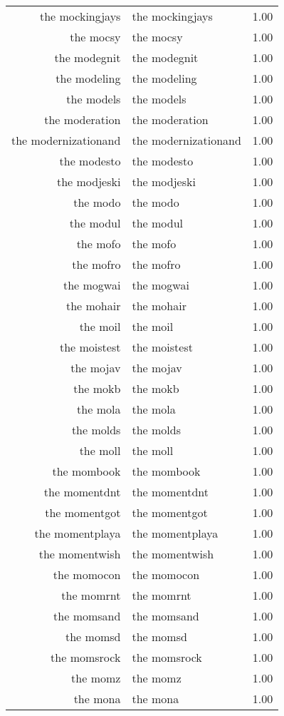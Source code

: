 \begin{table}[ht]
\begin{tabular}{rlr}
  the mockingjays & the mockingjays & 1.00 \\ 
  the mocsy & the mocsy & 1.00 \\ 
  the modegnit & the modegnit & 1.00 \\ 
  the modeling & the modeling & 1.00 \\ 
  the models & the models & 1.00 \\ 
  the moderation & the moderation & 1.00 \\ 
  the modernizationand & the modernizationand & 1.00 \\ 
  the modesto & the modesto & 1.00 \\ 
  the modjeski & the modjeski & 1.00 \\ 
  the modo & the modo & 1.00 \\ 
  the modul & the modul & 1.00 \\ 
  the mofo & the mofo & 1.00 \\ 
  the mofro & the mofro & 1.00 \\ 
  the mogwai & the mogwai & 1.00 \\ 
  the mohair & the mohair & 1.00 \\ 
  the moil & the moil & 1.00 \\ 
  the moistest & the moistest & 1.00 \\ 
  the mojav & the mojav & 1.00 \\ 
  the mokb & the mokb & 1.00 \\ 
  the mola & the mola & 1.00 \\ 
  the molds & the molds & 1.00 \\ 
  the moll & the moll & 1.00 \\ 
  the mombook & the mombook & 1.00 \\ 
  the momentdnt & the momentdnt & 1.00 \\ 
  the momentgot & the momentgot & 1.00 \\ 
  the momentplaya & the momentplaya & 1.00 \\ 
  the momentwish & the momentwish & 1.00 \\ 
  the momocon & the momocon & 1.00 \\ 
  the momrnt & the momrnt & 1.00 \\ 
  the momsand & the momsand & 1.00 \\ 
  the momsd & the momsd & 1.00 \\ 
  the momsrock & the momsrock & 1.00 \\ 
  the momz & the momz & 1.00 \\ 
  the mona & the mona & 1.00 \\ 

\end{tabular}
\end{table}
